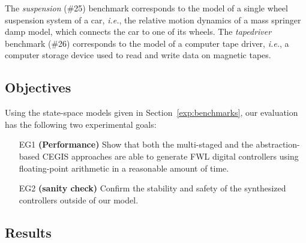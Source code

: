 \documentclass[twocolumn]{autart}    %
\begin{document}
The \textit{suspension} (\#25) benchmark corresponds to the model of a single wheel suspension 
system of a car, {\it i.e.}, the relative motion dynamics of a mass springer damp model, 
which connects the car to one of its wheels.  The \textit{tapedriver} benchmark (\#26)
corresponds to the model of a computer tape driver, \textit{i.e.}, a computer storage device 
used to read and write data on magnetic tapes. 





 



	
\subsection{Objectives}
\label{exp:objectives}

Using the state-space models given in Section~\ref{exp:benchmarks}, 
our evaluation has the following two experimental goals:

\begin{enumerate}

\item[EG1] \textbf{(Performance)} Show that both the multi-staged and the abstraction-based
CEGIS approaches are able to generate FWL digital controllers using floating-point arithmetic 
in a reasonable amount of time.

\item[EG2] \textbf{(sanity check)} Confirm the
stability and safety of the synthesized controllers outside of our model.

\end{enumerate}

\subsection{Results}
\label{exp:results}
\end{document}
